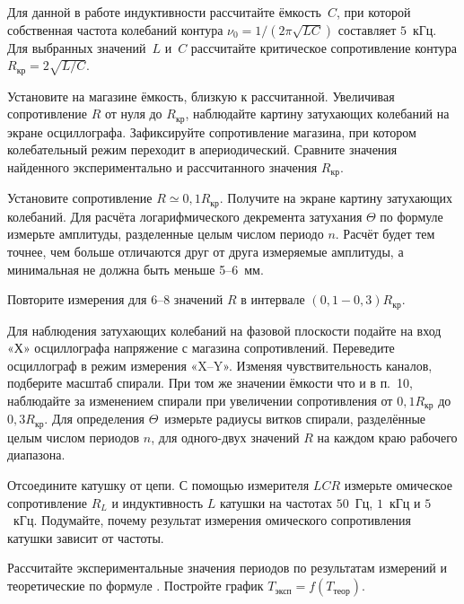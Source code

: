 \begin{lab:task}
	\item Для данной в работе индуктивности рассчитайте ёмкость~$C$, при которой
собственная частота колебаний контура $\nu_0 = 1/(2\pi\sqrt{LC})$ составляет
$5$~кГц. Для выбранных значений~$L$ и~$C$ рассчитайте критическое сопротивление
контура $R_\text{кр} = 2\sqrt{L/C}$.

	\item Установите на магазине ёмкость, близкую к рассчитанной. Увеличивая
сопротивление $R$ от нуля до  $R_\text{кр}$, наблюдайте картину затухающих
колебаний на экране осциллографа. Зафиксируйте сопротивление магазина, при
котором колебательный режим переходит в апериодический. Сравните значения
найденного экспериментально и рассчитанного значения  $R_\text{кр}$.

	\item Установите сопротивление $R \simeq 0,1 R_\text{кр}$. Получите
на экране картину затухающих колебаний. Для расчёта логарифмического декремента
затухания $\Theta$ по формуле  измерьте амплитуды,
разделенные целым числом периодо $n$. Расчёт будет тем точнее, чем больше
отличаются друг от друга измеряемые амплитуды, а минимальная не должна быть
меньше 5--6~мм.

	\item Повторите измерения для 6--8 значений $R$ в интервале $(0,1-0,3)R_\text{кр}$.



	\item Для наблюдения затухающих колебаний на фазовой плоскости подайте на
вход «Х» осциллографа напряжение с магазина сопротивлений. Переведите
осциллограф в режим измерения «X--Y». Изменяя чувствительность каналов,
подберите масштаб спирали. При том же значении ёмкости что и в п.~10, наблюдайте
за изменением спирали при увеличении сопротивления от $0,1R_\text{кр}$  до
$0,3R_\text{кр}$. Для определения $\Theta$~измерьте радиусы витков спирали,
разделённые целым числом периодов $n$, для одного-двух значений $R$ на каждом
краю рабочего диапазона.

	\item Отсоедините катушку от цепи. С помощью измерителя $LCR$ измерьте
омическое сопротивление $R_L$ и индуктивность $L$ катушки на частотах $50$~Гц,
$1$~кГц и $5$~кГц. Подумайте, почему результат измерения омического
сопротивления катушки зависит от частоты.


	\item Рассчитайте экспериментальные значения периодов по результатам
измерений и теоретические по формуле . 
Постройте график $T_\text{эксп} = f(T_\text{теор})$.


\end{lab:task}
